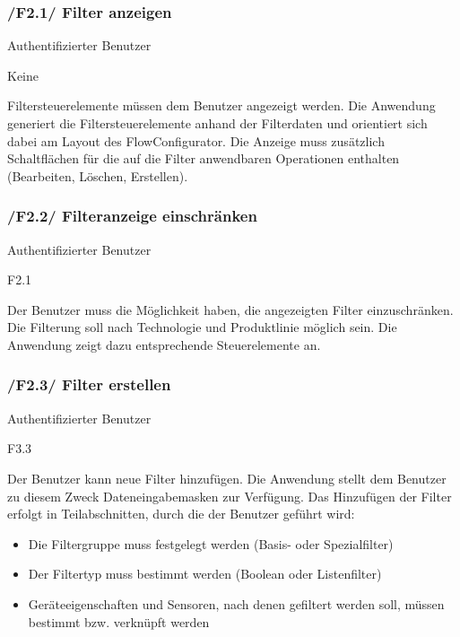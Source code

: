 \subsubsection{/F2.1/ Filter anzeigen}

\begin{description}[leftmargin=8em,style=nextline]
\item[Akteure] Authentifizierter Benutzer
\item[Includes] Keine
\item[Beschreibung]
Filtersteuerelemente müssen dem Benutzer angezeigt werden. Die Anwendung generiert die Filtersteuerelemente anhand der Filterdaten und orientiert sich dabei am Layout des FlowConfigurator. Die Anzeige muss zusätzlich Schaltflächen für die auf die Filter anwendbaren Operationen enthalten (Bearbeiten, Löschen, Erstellen).
\end{description}

\subsubsection{/F2.2/ Filteranzeige einschränken}

\begin{description}[leftmargin=8em,style=nextline]
\item[Akteure] Authentifizierter Benutzer
\item[Extends] F2.1 
\item[Beschreibung]
Der Benutzer muss die Möglichkeit haben, die angezeigten Filter einzuschränken. Die Filterung soll nach Technologie und Produktlinie möglich sein. Die Anwendung zeigt dazu entsprechende Steuerelemente an.
\end{description}

\subsubsection{/F2.3/ Filter erstellen}

\begin{description}[leftmargin=8em,style=nextline]
\item[Akteure] Authentifizierter Benutzer
\item[Includes] F3.3
\item[Beschreibung]
Der Benutzer kann neue Filter hinzufügen. Die Anwendung stellt dem Benutzer zu diesem Zweck Dateneingabemasken zur Verfügung. Das Hinzufügen der Filter erfolgt in Teilabschnitten, durch die der Benutzer geführt wird:

\begin{itemize}
\item Die Filtergruppe muss festgelegt werden (Basis- oder Spezialfilter)
\item Der Filtertyp muss bestimmt werden (Boolean oder Listenfilter) 
\item Geräteeigenschaften und Sensoren, nach denen gefiltert werden soll, müssen bestimmt bzw. verknüpft werden
\end{itemize}

\end{description}

